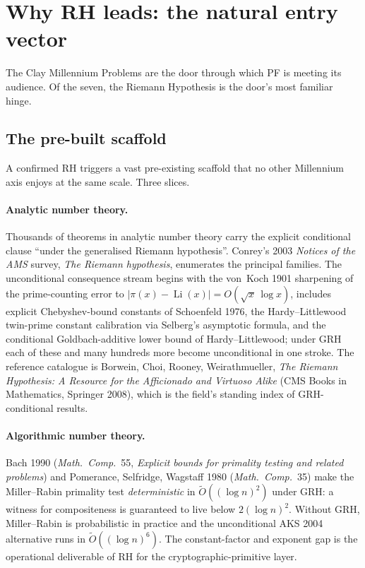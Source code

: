 \documentclass[11pt,a4paper]{article}
\theoremstyle{plain}
\theoremstyle{definition}
\begin{document}
\tableofcontents

\section{Why RH leads: the natural entry vector}
\label{sec:entry-vector}

The Clay Millennium Problems are the door through which PF is meeting
its audience. Of the seven, the Riemann Hypothesis is the door's most
familiar hinge.

\subsection{The pre-built scaffold}
\label{sec:prebuilt-scaffold}

A confirmed RH triggers a vast pre-existing scaffold that no other
Millennium axis enjoys at the same scale. Three slices.

\paragraph{Analytic number theory.} Thousands of theorems in analytic
number theory carry the explicit conditional clause ``under the
generalised Riemann hypothesis''. Conrey's 2003 \emph{Notices of the
AMS} survey, \emph{The Riemann hypothesis}, enumerates the principal
families. The unconditional consequence stream begins with the
von~Koch 1901 sharpening of the prime-counting error to
$|\pi(x) - \operatorname{Li}(x)| = O(\sqrt{x}\, \log x)$, includes
explicit Chebyshev-bound constants of Schoenfeld 1976, the
Hardy--Littlewood twin-prime constant calibration via Selberg's
asymptotic formula, and the conditional Goldbach-additive lower bound
of Hardy--Littlewood; under GRH each of these and many hundreds more
become unconditional in one stroke. The reference catalogue is
Borwein, Choi, Rooney, Weirathmueller, \emph{The Riemann Hypothesis: A
Resource for the Afficionado and Virtuoso Alike} (CMS Books in
Mathematics, Springer 2008), which is the field's standing index of
GRH-conditional results.

\paragraph{Algorithmic number theory.} Bach 1990 (\emph{Math.\ Comp.}~55,
\emph{Explicit bounds for primality testing and related problems}) and
Pomerance, Selfridge, Wagstaff 1980 (\emph{Math.\ Comp.}~35) make the
Miller--Rabin primality test \emph{deterministic} in
$\widetilde O((\log n)^2)$ under GRH: a witness for compositeness is
guaranteed to live below $2(\log n)^2$. Without GRH, Miller--Rabin is
probabilistic in practice and the unconditional AKS 2004 alternative
runs in $\widetilde O((\log n)^{6})$. The constant-factor and
exponent gap is the operational deliverable of RH for the
cryptographic-primitive layer.
\end{document}
